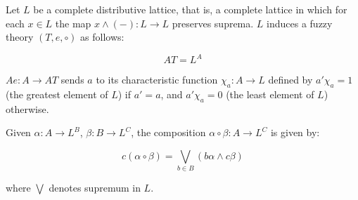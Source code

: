 Let $L$ be a complete distributive lattice, that is, a complete lattice in which for each $x \in L$ the map $x \wedge (-) : L \longrightarrow L$ preserves suprema. $L$ induces a fuzzy theory $(T, e, \circ)$ as follows:

$$AT = L^A$$

$Ae : A \longrightarrow AT$ sends $a$ to its characteristic function $\chi_a : A \longrightarrow L$ defined by $a' \chi_a = 1$ (the greatest element of $L$) if $a' = a$, and $a' \chi_a = 0$ (the least element of $L$) otherwise.

Given $\alpha : A \longrightarrow L^B$, $\beta : B \longrightarrow L^C$, the composition $\alpha \circ \beta : A \longrightarrow L^C$ is given by:

$$c(\alpha \circ \beta) = \bigvee_{b \in B} (b\alpha \wedge c\beta)$$

where $\bigvee$ denotes supremum in $L$.
